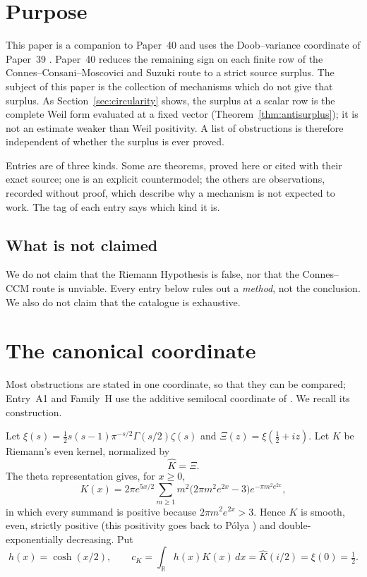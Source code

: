 \documentclass[11pt]{amsart}
\theoremstyle{definition}
\theoremstyle{remark}
\newcommand{\R}{\mathbb R}
\newcommand{\dd}{\,d}
\newcommand{\XiR}{\Xi}
\begin{document}
\maketitle
\tableofcontents

\section{Purpose}

This paper is a companion to Paper~40 \cite{TrejoPizzo40} and uses the
Doob--variance coordinate of Paper~39 \cite{TrejoPizzo39}.  Paper~40
reduces the remaining sign on each finite row of the
Connes--Consani--Moscovici and Suzuki route
\cite{Connes1999,CCM2025,Suzuki2025} to a strict source surplus.  The
subject of this paper is the collection of mechanisms which do not give
that surplus.  As Section~\ref{sec:circularity} shows, the surplus at a
scalar row is the complete Weil form evaluated at a fixed vector
(Theorem~\ref{thm:antisurplus}); it is not an estimate weaker than Weil
positivity.  A list of obstructions is therefore independent of whether
the surplus is ever proved.

Entries are of three kinds.  Some are theorems, proved here or cited with
their exact source; one is an explicit countermodel; the others are
observations, recorded without proof, which describe why a mechanism is
not expected to work.  The tag of each entry says which kind it is.

\subsection{What is not claimed}

We do not claim that the Riemann Hypothesis is false, nor that the
Connes--CCM route is unviable.  Every entry below rules out a
\emph{method}, not the conclusion.  We also do not claim that the
catalogue is exhaustive.

\section{The canonical coordinate}
\label{sec:coordinate}

Most obstructions are stated in one coordinate, so that they can be
compared; Entry~A1 and Family~H use the additive semilocal coordinate of
\cite{TrejoPizzo39}.  We recall its construction.

Let \(\xi(s)=\frac12s(s-1)\pi^{-s/2}\Gamma(s/2)\zeta(s)\) and
\(\XiR(z)=\xi(\frac12+iz)\).  Let \(K\) be Riemann's even kernel,
normalized by
\[
 \widehat K=\XiR .
\tag{2.1}
\]
The theta representation gives, for \(x\ge0\),
\[
 K(x)=2\pi e^{5x/2}\sum_{m\ge1}m^2\bigl(2\pi m^2e^{2x}-3\bigr)
 e^{-\pi m^2e^{2x}},
\tag{2.2}
\]
in which every summand is positive because \(2\pi m^2e^{2x}>3\).  Hence
\(K\) is smooth, even, strictly positive (this positivity goes back to
P\'olya \cite{Polya1926}) and double-exponentially decreasing.  Put
\[
 h(x)=\cosh(x/2),
 \qquad
 c_K=\int_\R h(x)K(x)\dd x=\widehat K(i/2)=\xi(0)=\tfrac12 .
\tag{2.3}
\]
\end{document}

